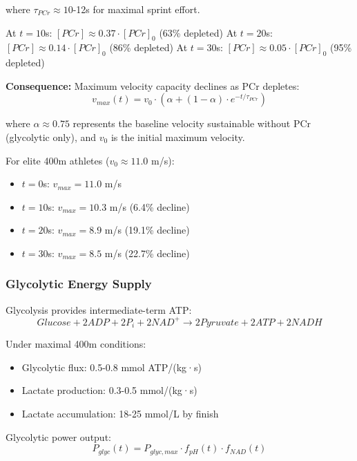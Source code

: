 where $\tau_{PCr} \approx 10$-12s for maximal sprint effort.

At $t = 10$s: $[PCr] \approx 0.37 \cdot [PCr]_0$ (63\% depleted)
At $t = 20$s: $[PCr] \approx 0.14 \cdot [PCr]_0$ (86\% depleted)
At $t = 30$s: $[PCr] \approx 0.05 \cdot [PCr]_0$ (95\% depleted)

\textbf{Consequence:} Maximum velocity capacity declines as PCr depletes:
\begin{equation}
v_{max}(t) = v_0 \cdot \left(\alpha + (1-\alpha) \cdot e^{-t/\tau_{PCr}}\right)
\end{equation}

where $\alpha \approx 0.75$ represents the baseline velocity sustainable without PCr (glycolytic only), and $v_0$ is the initial maximum velocity.

For elite 400m athletes ($v_0 \approx 11.0$ m/s):
\begin{itemize}
    \item $t = 0$s: $v_{max} = 11.0$ m/s
    \item $t = 10$s: $v_{max} = 10.3$ m/s (6.4\% decline)
    \item $t = 20$s: $v_{max} = 8.9$ m/s (19.1\% decline)
    \item $t = 30$s: $v_{max} = 8.5$ m/s (22.7\% decline)
\end{itemize}

\subsubsection{Glycolytic Energy Supply}

Glycolysis provides intermediate-term ATP:
\begin{equation}
Glucose + 2ADP + 2P_i + 2NAD^+ \rightarrow 2Pyruvate + 2ATP + 2NADH
\end{equation}

Under maximal 400m conditions:
\begin{itemize}
    \item Glycolytic flux: 0.5-0.8 mmol ATP/(kg·s)
    \item Lactate production: 0.3-0.5 mmol/(kg·s)
    \item Lactate accumulation: 18-25 mmol/L by finish
\end{itemize}

Glycolytic power output:
\begin{equation}
P_{glyc}(t) = P_{glyc,max} \cdot f_{pH}(t) \cdot f_{NAD}(t)
\end{equation}

